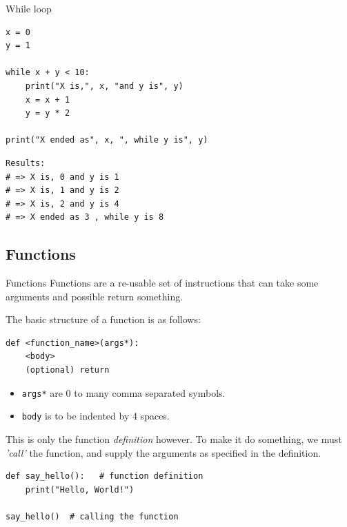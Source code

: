 \documentclass[10pt]{beamer}
\begin{document}
\begin{frame}[label={sec:orgc8a196f},fragile]{While loop}
 \begin{verbatim}
x = 0
y = 1

while x + y < 10:
    print("X is,", x, "and y is", y)
    x = x + 1
    y = y * 2

print("X ended as", x, ", while y is", y)
\end{verbatim}

\begin{verbatim}
Results: 
# => X is, 0 and y is 1
# => X is, 1 and y is 2
# => X is, 2 and y is 4
# => X ended as 3 , while y is 8
\end{verbatim}
\end{frame}

\subsection{Functions}
\label{sec:orgaf44f48}
\begin{frame}[label={sec:org7dadadb},fragile]{Functions}
 Functions are a re-usable set of instructions that can take some arguments and
possible return something.

The basic structure of a function is as follows:

\begin{verbatim}
def <function_name>(args*):
    <body>
    (optional) return
\end{verbatim}

\begin{itemize}
\item \texttt{args*} are 0 to many comma separated symbols.
\item \texttt{body} is to be indented by 4 spaces.
\end{itemize}

This is only the function \emph{definition} however. To make it do something, we must \emph{'call'}
the function, and supply the arguments as specified in the definition.

\begin{verbatim}
def say_hello():   # function definition
    print("Hello, World!")

say_hello()  # calling the function
\end{verbatim}
\end{frame}
\end{document}
